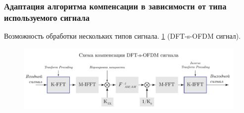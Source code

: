 \subsubsection{Адаптация алгоритма компенсации в зависимости от типа используемого сигнала}
\label{sec:apadt}
Возможность обработки нескольких типов сигнала.
\ref{fig:dfts_compensation_scheme} (DFT-s-OFDM сигнал). 

\begin{figure}[h!]
    \centering
    \includegraphics[width=0.99\linewidth]{figs/dfts_compensation_scheme.pdf}
    \caption{}
    \label{fig:dfts_compensation_scheme}
\end{figure}
